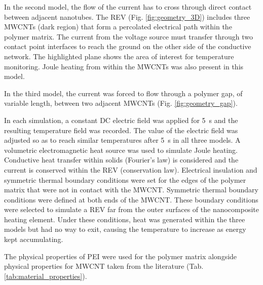 \documentclass[11pt,review,times]{article}
\begin{document}
In the second model, the flow of the current has to cross through direct contact between adjacent nanotubes. 
The REV (Fig. \ref{fig:geometry_3D}) includes three MWCNTs (dark region) that form a percolated electrical path within the polymer matrix. 
The current from the voltage source must transfer through two contact point interfaces to reach the ground on the other side of the conductive network. 
The highlighted plane shows the area of interest for temperature monitoring. 
Joule heating from within the MWCNTs was also present in this model. 

In the third model, the current was forced to flow through a polymer gap, of variable length, between two adjacent MWCNTs (Fig. \ref{fig:geometry_gap}). 

In each simulation, a constant DC electric field was applied for \SI{5}{\second} and the resulting temperature field was recorded. 
The value of the electric field was adjusted so as to reach similar temperatures after \SI{5}{\second} in all three models. 
A volumetric electromagnetic heat source was used to simulate Joule heating. 
Conductive heat transfer within solids (Fourier's law) is considered and the current is conserved within the REV (conservation law). 
Electrical insulation and symmetric thermal boundary conditions were set for the edges of the polymer matrix that were not in contact with the MWCNT. 
Symmetric thermal boundary conditions were defined at both ends of the MWCNT. 
These boundary conditions were selected to simulate a REV far from the outer surfaces of the nanocomposite heating element. 
Under these conditions, heat was generated within the three models but had no way to exit, causing the temperature to increase as energy kept accumulating.

The physical properties of PEI were used for the polymer matrix alongside physical properties for MWCNT taken from the literature (Tab. \ref{tab:material_properties}). 
\end{document}
